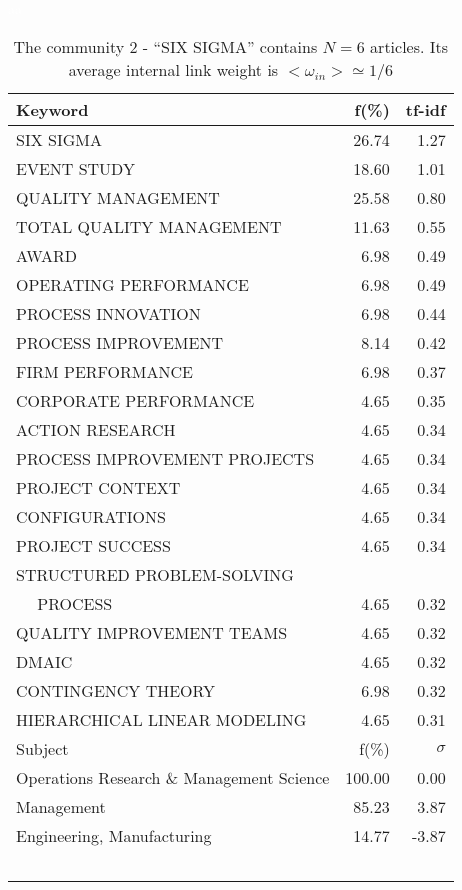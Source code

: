 \documentclass[a4paper,11pt]{report}
\begin{document}
\begin{landscape}
\clearpage

\begin{table}[!ht]
\caption{The community 2 - ``SIX SIGMA'' contains $N = 6$ articles. Its average internal link weight is $<\omega_{in}> \simeq 1/6$ }
\textcolor{white}{aa}\\
{\scriptsize\begin{tabular}{|l r  r|}
\hline
Keyword & f(\%) & tf-idf \\
\hline
SIX SIGMA & 26.74 & 1.27\\
EVENT STUDY & 18.60 & 1.01\\
QUALITY MANAGEMENT & 25.58 & 0.80\\
TOTAL QUALITY MANAGEMENT & 11.63 & 0.55\\
AWARD & 6.98 & 0.49\\
OPERATING PERFORMANCE & 6.98 & 0.49\\
PROCESS INNOVATION & 6.98 & 0.44\\
PROCESS IMPROVEMENT & 8.14 & 0.42\\
FIRM PERFORMANCE & 6.98 & 0.37\\
CORPORATE PERFORMANCE & 4.65 & 0.35\\
ACTION RESEARCH & 4.65 & 0.34\\
PROCESS IMPROVEMENT PROJECTS & 4.65 & 0.34\\
PROJECT CONTEXT & 4.65 & 0.34\\
CONFIGURATIONS & 4.65 & 0.34\\
PROJECT SUCCESS & 4.65 & 0.34\\
STRUCTURED PROBLEM-SOLVING &  &\\
$\quad$ PROCESS & 4.65 & 0.32\\
QUALITY IMPROVEMENT TEAMS & 4.65 & 0.32\\
DMAIC & 4.65 & 0.32\\
CONTINGENCY THEORY & 6.98 & 0.32\\
HIERARCHICAL LINEAR MODELING & 4.65 & 0.31\\
\hline
\hline
Subject & f(\%) & $\sigma$\\
\hline
Operations Research \& Management Science & 100.00 & 0.00\\
Management & 85.23 & 3.87\\
Engineering, Manufacturing & 14.77 & -3.87\\
 &  & \\
 &  & \\
 &  & \\
 &  & \\
 &  & \\

\end{tabular}}
\end{table}
\end{landscape}
\end{document}
